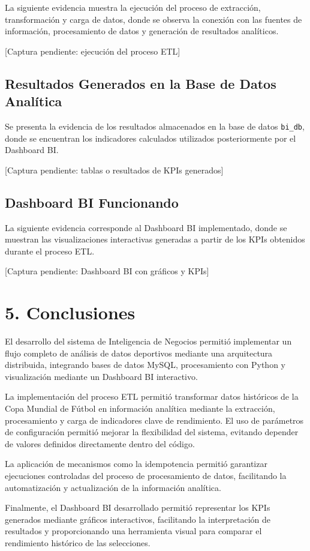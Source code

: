 \documentclass[
  letterpaper,
  DIV=11,
  numbers=noendperiod]{scrartcl}
\begin{document}
La siguiente evidencia muestra la ejecución del proceso de extracción,
transformación y carga de datos, donde se observa la conexión con las
fuentes de información, procesamiento de datos y generación de
resultados analíticos.

{[}Captura pendiente: ejecución del proceso ETL{]}

\subsection{Resultados Generados en la Base de Datos
Analítica}\label{resultados-generados-en-la-base-de-datos-analuxedtica}

Se presenta la evidencia de los resultados almacenados en la base de
datos \texttt{bi\_db}, donde se encuentran los indicadores calculados
utilizados posteriormente por el Dashboard BI.

{[}Captura pendiente: tablas o resultados de KPIs generados{]}

\subsection{Dashboard BI Funcionando}\label{dashboard-bi-funcionando}

La siguiente evidencia corresponde al Dashboard BI implementado, donde
se muestran las visualizaciones interactivas generadas a partir de los
KPIs obtenidos durante el proceso ETL.

{[}Captura pendiente: Dashboard BI con gráficos y KPIs{]}

\section{5. Conclusiones}\label{conclusiones}

El desarrollo del sistema de Inteligencia de Negocios permitió
implementar un flujo completo de análisis de datos deportivos mediante
una arquitectura distribuida, integrando bases de datos MySQL,
procesamiento con Python y visualización mediante un Dashboard BI
interactivo.

La implementación del proceso ETL permitió transformar datos históricos
de la Copa Mundial de Fútbol en información analítica mediante la
extracción, procesamiento y carga de indicadores clave de rendimiento.
El uso de parámetros de configuración permitió mejorar la flexibilidad
del sistema, evitando depender de valores definidos directamente dentro
del código.

La aplicación de mecanismos como la idempotencia permitió garantizar
ejecuciones controladas del proceso de procesamiento de datos,
facilitando la automatización y actualización de la información
analítica.

Finalmente, el Dashboard BI desarrollado permitió representar los KPIs
generados mediante gráficos interactivos, facilitando la interpretación
de resultados y proporcionando una herramienta visual para comparar el
rendimiento histórico de las selecciones.
\end{document}
